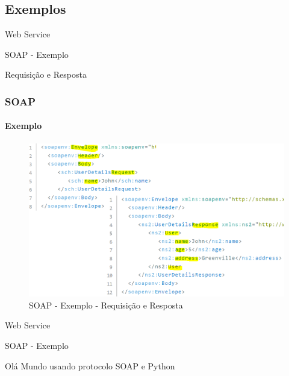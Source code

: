 \documentclass[
	9pt, %
	t, %
]{beamer}
\begin{document}
\subsection{Exemplos}

\begin{frame}
	\begin{center}
		
		\bigskip\bigskip\bigskip\bigskip %
		{\Large Web Service}
		
		\bigskip\bigskip %
		{\Huge SOAP - Exemplo}
		
		\smallskip
		{\small Requisição e Resposta} 
	\end{center}

\end{frame}

\begin{frame}
	\frametitle{SOAP}
	\framesubtitle{Exemplo}
	
	\begin{figure}
		\includegraphics[width=0.8\linewidth]{soap_example_user.png}
		\caption{SOAP - Exemplo - Requisição e Resposta}
		\label{fig:soap_example_user}
	\end{figure}

\end{frame}

\begin{frame}
	\begin{center}
		
		\bigskip\bigskip\bigskip\bigskip %
		{\Large Web Service}
		
		\bigskip\bigskip %
		{\Huge SOAP - Exemplo}
		
		\smallskip
		{\small Olá Mundo usando protocolo SOAP e Python} 
	\end{center}

\end{frame}
\end{document}
